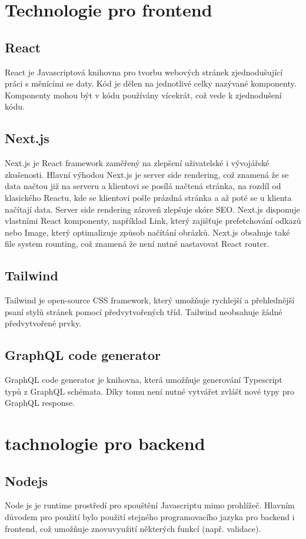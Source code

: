 \documentclass[12pt, a4paper,
 twoside,        %
 openright
]{report}
\begin{document}
\section{Technologie pro frontend}
\subsection{React}
React je Javascriptová knihovna pro tvorbu webových stránek zjednodušující práci s měnícími se daty. Kód je dělen na jednotlivé celky nazývané komponenty. Komponenty mohou být v kódu používány vícekrát, což vede k zjednodušení kódu.
\subsection{Next.js}
Next.js je React framework zaměřený na zlepšení uživatelské i vývojářské zkušenosti. Hlavní výhodou Next.js je server side rendering, což znamená že se data načtou již na serveru a klientovi se posílá načtená stránka, na rozdíl od klasického Reactu, kde se klientovi pošle prázdná stránka a až poté se u klienta načítají data. Server side rendering zároveň zlepšuje skóre SEO. Next.js disponuje vlastními React komponenty, například Link, který zajišťuje prefetchování odkazů nebo Image, který optimalizuje způsob načítání obrázků. Next.js obsahuje také file system rounting, což znamená že není nutné nastavovat React router.
\subsection{Tailwind}
Tailwind je open-source CSS framework, který umožňuje rychlejší a přehlednější psaní stylů stránek pomocí předvytvořených tříd. Tailwind neobsahuje žádné předvytvořené prvky.
\subsection{GraphQL code generator}
GraphQL code generator je knihovna, která umožňuje generování Typescript typů z GraphQL schémata. Díky tomu není nutné vytvářet zvlášť nové typy pro GraphQL response.
\section{tachnologie pro backend}
\subsection{Nodejs}
Node js je runtime prostředí pro spouštění Javascriptu mimo prohlížeč. Hlavním důvodem pro použití bylo použití stejného programovacího jazyka pro backend i frontend, což umožňuje znovuvyužití některých funkcí (např. validace).
 
\end{document}
